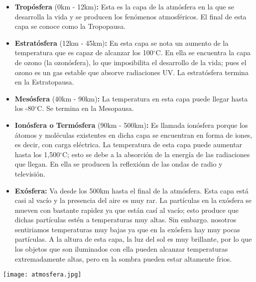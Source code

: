 \documentclass[11pt]{article}
\begin{document}
\begin{itemize}

\item\textbf{Tropósfera} (0km - 12km)\textbf{:}
Esta es la capa de la atmósfera en la que se desarrolla la vida y se producen los fenómenos atmosféricos. El final de esta capa se conoce como la Tropopausa.

\item\textbf{Estratósfera} (12km - 45km)\textbf{:}
En esta capa se nota un aumento de la temperatura que es capaz de alcanzar los 100$^{\circ}$C. En ella se encuentra la capa de ozono (la ozonósfera), lo que imposibilita el desarrollo de la vida; pues el ozono es un gas estable que absorve radiaciones UV. La estratósfera termina en la Estratopausa.

\item\textbf{Mesósfera} (40km - 90km)\textbf{:}
La temperatura en esta capa puede llegar hasta los -80$^{\circ}$C. Se termina en la Mesopausa. 

\item\textbf{Ionósfera o Termósfera} (90km - 500km)\textbf{:}
Es llamada ionósfera porque los átomos y moléculas existentes en dicha capa se encuentran en forma de iones, es decir, con carga eléctrica. La temperatura de esta capa  puede aumentar hasta los 1,500$^{\circ}$C; esto se debe a la absorción de la energía de las radiaciones que llegan. En ella se producen la reflexiónn de las ondas de radio y televisión.

\item\textbf{Exósfera:}
Va desde los 500km hasta el final de la atmósfera. Esta capa está casi al vacío y la presencia del aire es muy rar. La partículas en la exósfera se mueven con bastante rapidez ya que están casí al vacío; esto produce que dichas partículas estén a temperaturas muy altas. Sin embargo. nosotros sentiriamos temperaturas muy bajas ya que en la exósfera hay muy pocas partículas. 
\vspace*{0.25cm}
A la altura de esta capa, la luz del sol es muy brillante, por lo que los objetos que son iluminados con ella pueden alcanzar temperaturas extremadamente altas, pero en la sombra pueden estar altamente frios. 

\end{itemize}

\vspace*{0.5cm}
\begin{center}
\texttt{[image: atmosfera.jpg]}
\end{center}
\end{document}
